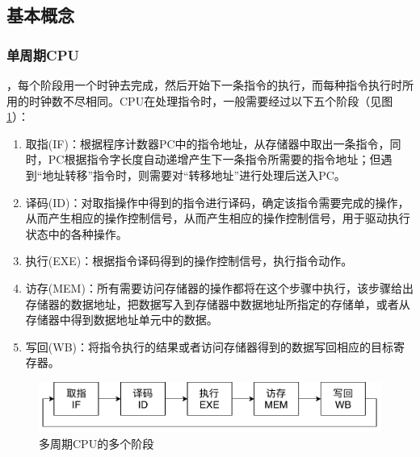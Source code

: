 
\subsection{基本概念}
\subsubsection{单周期CPU}
，每个阶段用一个时钟去完成，然后开始下一条指令的执行，而每种指令执行时所用的时钟数不尽相同。CPU在处理指令时，一般需要经过以下五个阶段（见图\ref{fig:phases}）：
\begin{enumerate}
	\item 取指(IF)：根据程序计数器PC中的指令地址，从存储器中取出一条指令，同时，PC根据指令字长度自动递增产生下一条指令所需要的指令地址；但遇到``地址转移''指令时，则需要对``转移地址''进行处理后送入PC。
	\item 译码(ID)：对取指操作中得到的指令进行译码，确定该指令需要完成的操作，从而产生相应的操作控制信号，从而产生相应的操作控制信号，用于驱动执行状态中的各种操作。
	\item 执行(EXE)：根据指令译码得到的操作控制信号，执行指令动作。
	\item 访存(MEM)：所有需要访问存储器的操作都将在这个步骤中执行，该步骤给出存储器的数据地址，把数据写入到存储器中数据地址所指定的存储单，或者从存储器中得到数据地址单元中的数据。
	\item 写回(WB)：将指令执行的结果或者访问存储器得到的数据写回相应的目标寄存器。
\end{enumerate}
\begin{figure}[H]
\centering
\includegraphics[width=0.6\linewidth]{fig/Phases.pdf}
\caption{多周期CPU的多个阶段}
\label{fig:phases}
\end{figure}

